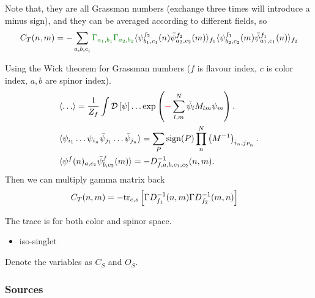 Note that, they are all Grassman numbers (exchange three times will introduce a minus sign), and they can be averaged according to different fields, so
\begin{equation}
\begin{split}
&C_T(n,m)=-\sum _{{a,b,c}_i}\textcolor[rgb]{0,0.5,0}{\Gamma _{a_1,b_1}}\textcolor[rgb]{0,0.5,0}{\Gamma _{a_2,b_2}}\langle \psi ^{f_2} _{b_1,c_1} (n)\bar{\psi} ^{f_2} _{a_2,c_2}(m)\rangle _{f_1}\langle \psi ^{f_1}_{b_2,c_2}(m)\bar{\psi} ^{f_1} _{a_1,c_1} (n)\rangle _{f_2}\\
\end{split}
\end{equation}

Using the Wick theorem for Grassman numbers ($f$ is flavour index, $c$ is color index, $a,b$ are spinor index).
\begin{equation}
\begin{split}
&\langle \ldots \rangle = \frac{1}{Z_f}\int \mathcal{D}\left[\psi\right]\ldots \exp \left(\textcolor[rgb]{1,0,0}{-}\sum _{l,m}^N\bar{\psi}_lM_{lm}\psi_m\right).\\
&\langle \psi _{i_1}\ldots \psi _{i_n} \bar{\psi}_{j_1}\ldots \bar{\psi}_{j_n}\rangle = \sum _{P}{\rm sign}(P)\prod ^N_n \left(M^{-1}\right)_{i_n,j_{P_n}}.\\
&\langle \psi^f (n)_{a,c_1}\bar{\psi}^f_{b,c_2}(m)\rangle = -D_{f,a,b,c_1,c_2}^{-1}(n,m).\\
\end{split}
\end{equation}
Then we can multiply gamma matrix back
\begin{equation}
\begin{split}
&C_T(n,m)=-{\rm tr}_{c,s} \left[\Gamma D^{-1}_{f_1}(n,m)\Gamma D^{-1}_{f_2}(m,n)\right]
\end{split}
\end{equation}

The trace is for both color and spinor space. 

\begin{itemize}
  \item iso-singlet
\end{itemize}

Denote the variables as $C_S$ and $O_S$.

\subsubsection{\label{Source}Sources}

